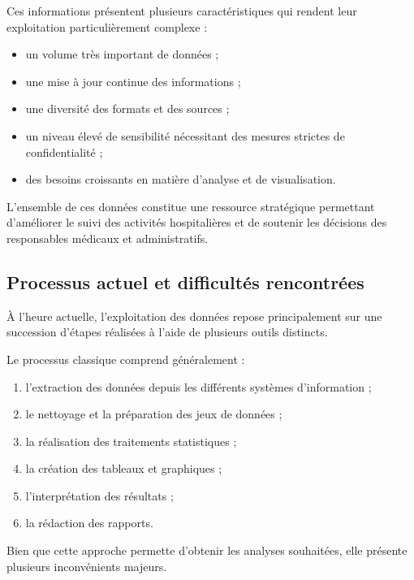Ces informations présentent plusieurs caractéristiques qui rendent leur exploitation particulièrement complexe :

\begin{itemize}
  \item un volume très important de données ;
  \item une mise à jour continue des informations ;
  \item une diversité des formats et des sources ;
  \item un niveau élevé de sensibilité nécessitant des mesures strictes de confidentialité ;
  \item des besoins croissants en matière d'analyse et de visualisation.
\end{itemize}

L'ensemble de ces données constitue une ressource stratégique permettant d'améliorer le suivi des activités hospitalières et de soutenir les décisions des responsables médicaux et administratifs.

\subsection{Processus actuel et difficultés rencontrées}

À l'heure actuelle, l'exploitation des données repose principalement sur une succession d'étapes réalisées à l'aide de plusieurs outils distincts.

Le processus classique comprend généralement :

\begin{enumerate}
  \item l'extraction des données depuis les différents systèmes d'information ;
  \item le nettoyage et la préparation des jeux de données ;
  \item la réalisation des traitements statistiques ;
  \item la création des tableaux et graphiques ;
  \item l'interprétation des résultats ;
  \item la rédaction des rapports.
\end{enumerate}

Bien que cette approche permette d'obtenir les analyses souhaitées, elle présente plusieurs inconvénients majeurs.

